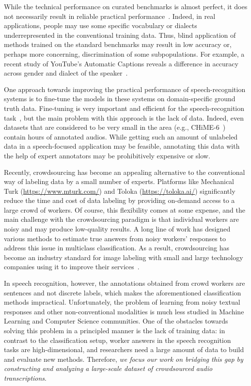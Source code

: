 \documentclass{article}
\begin{document}
While the technical performance on curated benchmarks is almost perfect, it does not necessarily result in reliable practical performance~\citep{szymanski20werwer}. Indeed, in real applications, people may use some specific vocabulary or dialects underrepresented in the conventional training data. Thus, blind application of methods trained on the standard benchmarks may result in low accuracy or, perhaps more concerning, discrimination of some subpopulations. For example, a recent study of YouTube's Automatic Captions reveals a difference in accuracy across gender and dialect of the speaker~\citep{tatman17gender}.

One approach towards improving the practical performance of speech-recognition systems is to fine-tune the models in these systems on domain-specific ground truth data. Fine-tuning is very important and efficient for the speech-recognition task~\citep{chan21speechstew,yu2010roles}, but the main problem with this approach is the lack of data. Indeed, even datasets that are considered to be very small in the area (e.g., CHiME-6~\citep{watanabe20chime6}) contain hours of annotated audios. While getting such an amount of unlabeled data in a speech-focused application may be feasible, annotating this data with the help of expert annotators may be prohibitively expensive or slow.

Recently, crowdsourcing has become an appealing alternative to the conventional way of labeling data by a small number of experts. Platforms like Mechanical Turk (\url{https://www.mturk.com/}) and Toloka (\url{https://toloka.ai/}) significantly reduce the time and cost of data labeling by providing on-demand access to a large crowd of workers. Of course, this flexibility comes at some expense, and the main challenge with the crowdsourcing paradigm is that individual workers are noisy and may produce low-quality results. A long line of work \citep[and others]{Dawid1979MaximumLE,karger11iterative,shah16permutation,sheng08get,whitehill09count,zhang2014spectral} has designed various methods to estimate true answers from noisy workers' responses to address this issue in multiclass classification. As a result, crowdsourcing has become an industry standard for image labeling with small and large technology companies  using it to improve their services~\citep{drutsa19practice}.

In speech recognition, however, the annotations obtained from crowd workers are sentences and not discrete labels, which makes the aforementioned classification methods impractical. Unfortunately, the problem of learning from noisy textual responses and other non-conventional modalities is much less studied in Machine Learning and Computer Science communities. One of the obstacles towards solving this problem in a principled manner is the lack of training data: in contrast to the classification setup, worker answers in the speech recognition tasks are high-dimensional, and researchers need a large amount of data to build and evaluate new methods. Therefore, \emph{we focus our work  on bridging this gap by constructing and analyzing a large-scale dataset of crowdsourced audio transcriptions}.
\end{document}

